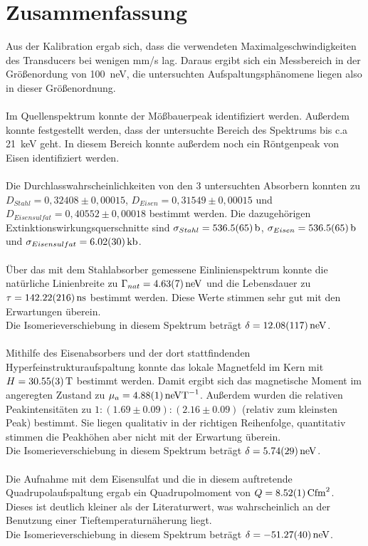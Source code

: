 \documentclass[12pt,a4paper]{article}
\begin{document}
\section{Zusammenfassung}
Aus der Kalibration ergab sich, dass die verwendeten Maximalgeschwindigkeiten des Transducers bei wenigen mm/s lag. Daraus ergibt sich ein Messbereich in der Größenordung von \SI{100}{neV}, die untersuchten Aufspaltungsphänomene liegen also in dieser Größenordnung.\\
\\
Im Quellenspektrum konnte der Mößbauerpeak identifiziert werden. Außerdem konnte festgestellt werden, dass der untersuchte Bereich des Spektrums bis c.a \SI{21}{keV} geht. In diesem Bereich konnte außerdem noch ein Röntgenpeak von Eisen identifiziert werden.\\
\\
Die Durchlasswahrscheinlichkeiten von den 3 untersuchten Absorbern konnten zu $D_{Stahl} = 0,32408 \pm 0,00015$, $D_{Eisen} = 0,31549 \pm 0,00015$ und $D_{Eisensulfat} = 0,40552 \pm 0,00018$ bestimmt werden. Die dazugehörigen Extinktionswirkungsquerschnitte sind $\sigma_{Stahl} = \SI{536,5 \pm 6,5}{b}$, $\sigma_{Eisen} = \SI{536,5 \pm 6,5}{b}$ und $\sigma_{Eisensulfat} = \SI{6,02 \pm 0,30}{kb}$.\\
\\
Über das mit dem Stahlabsorber gemessene Einlinienspektrum konnte die natürliche Linienbreite zu $\Gamma_{nat} = \SI{4.63\pm 0.07}{neV}$ und die Lebensdauer zu $\tau = \SI{142.22\pm2.16}{ns}$ bestimmt werden. Diese Werte stimmen sehr gut mit den Erwartungen überein.\\
Die Isomerieverschiebung in diesem Spektrum beträgt $\delta = \SI{12.08\pm 1.17}{neV}$.\\
\\
Mithilfe des Eisenabsorbers und der dort stattfindenden Hyperfeinstrukturaufspaltung konnte das lokale Magnetfeld im Kern mit $H = \SI{30.55\pm 0.03}{T}$ bestimmt werden. Damit ergibt sich das magnetische Moment im angeregten Zustand zu $\mu_a = \SI{4.88\pm 0.01}{neVT^{-1}}$. Außerdem wurden die relativen Peakintensitäten zu $1:(1.69\pm0.09):(2.16\pm0.09)$ (relativ zum kleinsten Peak) bestimmt. Sie liegen qualitativ in der richtigen Reihenfolge, quantitativ stimmen die Peakhöhen aber nicht mit der Erwartung überein.\\
Die Isomerieverschiebung in diesem Spektrum beträgt $\delta = \SI{5.74\pm 0.29}{neV}$.\\
\\
Die Aufnahme mit dem Eisensulfat und die in diesem auftretende Quadrupolaufspaltung ergab ein Quadrupolmoment von $Q = \SI{8.52\pm 0.01}{Cfm^2}$. Dieses ist deutlich kleiner als der Literaturwert, was wahrscheinlich an der Benutzung einer Tieftemperaturnäherung liegt.\\
Die Isomerieverschiebung in diesem Spektrum beträgt $\delta = \SI{-51.27\pm 0.40}{neV}$.\\
\end{document}
